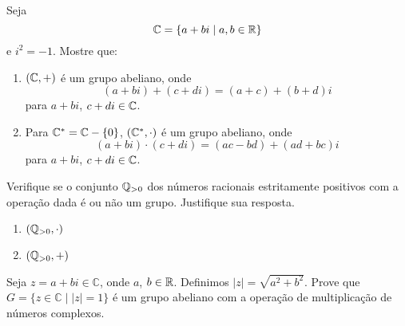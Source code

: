 \documentclass[12pt]{article}
\begin{document}
\vesp

\questao{} Seja
\[
	\mathbb{C} = \{a + bi \mid a, b \in \mathbb{R}\}
\]
e $i^2 = -1$. Mostre que:
\begin{enumerate}[label=({\alph*})]
	\item $(\mathbb{C}, +)$ \'e um grupo abeliano, onde
	\[
		(a + bi) + (c + di) = (a + c) + (b + d)i 
	\]
	para $a + bi$, $c + di \in \mathbb{C}$.
	\item Para $\mathbb{C}^* = \mathbb{C} - \{0\}$, $(\mathbb{C}^*, \cdot)$ \'e um grupo abeliano, onde
	\[
		(a + bi)\cdot (c + di) = (ac - bd) + (ad + bc)i 
	\]
	para $a + bi$, $c + di \in \mathbb{C}$.
\end{enumerate}

\vesp

\questao{} Verifique se o conjunto $\mathbb{Q}_{>0}$ dos n{\'u}meros racionais estritamente positivos com a
 opera{\c c}{\~a}o dada {\'e} ou n{\~a}o um grupo. Justifique sua
resposta.
\begin{multicols}{2}
\begin{enumerate}[label=({\alph*})]
\item $(\mathbb{Q}_{>0},\cdot)$
\item $(\mathbb{Q}_{>0}, +)$
\end{enumerate}
\end{multicols}

\vesp




\vesp

\questao{} Seja $z  = a + bi \in \mathbb{C}$, onde $a$, $b \in \mathbb{R}$. Definimos $|z| = \sqrt{a^2 + b^2}$. Prove que $G=\{z \in \mathbb{C} \mid |z| = 1\}$ {\'e} um grupo
abeliano com a opera{\c c}{\~a}o de multiplica{\c c}{\~a}o de n{\'u}meros complexos.
\end{document}
